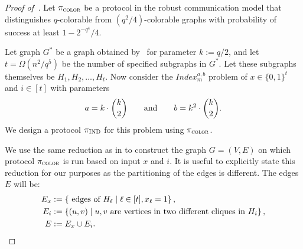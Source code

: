 \documentclass[11pt]{article}
\theoremstyle{definition}
\newcommand{\set}[1]{\ensuremath{\left\{ #1 \right\}}}
\newcommand{\prot}{\ensuremath{\pi}}
\newcommand{\protindex}{\ensuremath{\prot_{\textnormal{\textsc{IND}}}}}
\begin{document}
\begin{proof}[Proof of~]
	Let $\pi_{\textsc{color}}$ be a protocol in the robust communication model that distinguishes $q$-colorable from $(q^2/4)$-colorable graphs with probability of success at least $1-2^{-q^4}/4$.

	Let graph $G^*$ be a graph obtained by~ for parameter $k:=q/2$, and let $t=\Omega(n^2/q^5)$ be the number of  specified subgraphs in $G^*$. Let these subgraphs themselves be $H_1, H_2, \ldots, H_t$. 
	 Now consider the $Index^{a,b}_m$ problem of $x\in\{0, 1\}^t$ and $i\in [t]$ with parameters 
	\begin{equation}\label{eq:a-b-values}
		a = k \cdot \binom{k}{2} \qquad \textnormal{and} \qquad b = k^2 \cdot \binom{k}{2}.
	\end{equation}
	We design a protocol $\protindex$ for this problem using $\pi_{\textsc{color}}$.
	
	
\newcommand{\xcopy}[2]{\ensuremath{x_{#1}^{#2}}}
\newcommand{\icopy}[1]{\ensuremath{i^{#1}}}
	
	We use the same reduction as in  to construct the graph $G = (V, E)$ on which protocol $\pi_{\textsc{color}}$ is run based on input $x$ and $i$. 
	It is useful to explicitly state this reduction for our purposes as the partitioning of the edges is different. 
	The edges $E$ will be:
	\begin{align*}
		E_x &:= \set{\textnormal{ edges of $H_{\ell}$} \mid \ell \in [t], x_{\ell} = 1}, \\
		E_i &:= \set{(u,v) \mid u, v\textnormal{ are vertices in two different cliques in }H_i},\\
		E &:= E_x \cup E_i. 
	\end{align*}
	


\end{proof}
\end{document}
